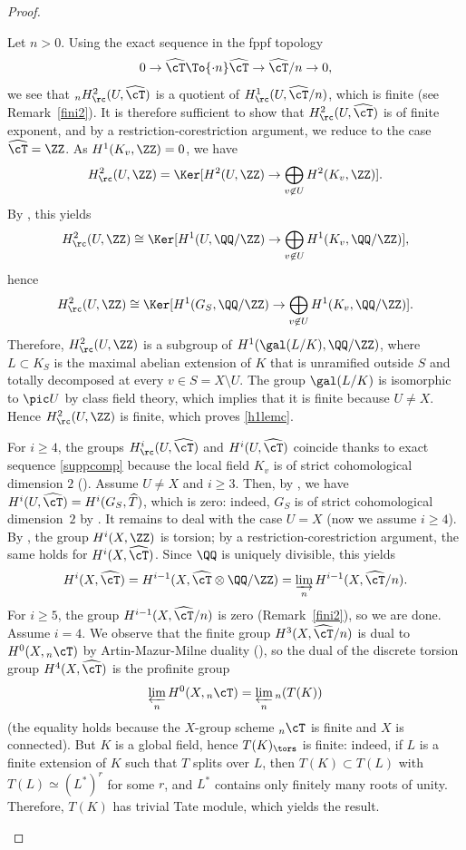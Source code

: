 \begin{proof}
\begin{enumeratea}
\item
Let $n >0$. Using the exact sequence in the fppf topology\vspace*{-3pt}
\begin{equation} \label{dualkummer}
0 \to \widehat\cT \To{\cdot n} \widehat\cT \to
\widehat\cT/n \to 0,
\end{equation}
we see that $_n H^2_\rc(U,\widehat\cT)$ is a quotient of
$H^1_\rc(U,\widehat\cT/n)$, which is finite (see Remark~\ref{fini2}).
It is therefore sufficient to show that $H^2_\rc(U,\widehat\cT)$ is
of finite exponent, and by a restriction-corestriction argument, we
reduce to the case $\widehat\cT=\ZZ$. As $H^1(K_v,\ZZ)=0$,
we have
\[
H^2_\rc(U,\ZZ)=\Ker [H^2(U,\ZZ) \to \bigoplus_{v \not \in U} H^2(K_v,\ZZ)].
\]
By \cite[Lem.\,II.2.10]{MilADT}, this yields
\[
H^2_\rc(U,\ZZ) \cong \Ker [H^1(U,\QQ/\ZZ) \to
\bigoplus_{v \not \in U} H^1(K_v,\QQ/\ZZ)],
\] hence
\[
H^2_\rc(U,\ZZ) \cong
\Ker [H^1(G_S,\QQ/\ZZ) \to \bigoplus_{v \not \in U} H^1(K_v,\QQ/\ZZ)].
\]
Therefore, $H^2_\rc(U,\ZZ)$ is a subgroup of $H^1(\gal(L/K),\QQ/\ZZ)$, where
$L \subset K_S$
is the maximal abelian extension of $K$ that is unramified outside $S$
and totally decomposed at every $v \in S=X \setminus U$.
The group $\gal(L/K)$ is isomorphic to $\pic U$ by class field
theory, which implies that it is finite because $U \neq X$. Hence
$H^2_\rc(U,\ZZ)$ is finite, which proves \eqref{h1lemc}.

\item
For $i \geq 4$, the groups $H^i_\rc(U,\widehat \cT)$ and $H^i(U, \widehat \cT)$
coincide thanks to exact sequence \eqref{suppcomp} because
the local field $K_v$ is of strict cohomological dimension $2$
(\cite[Cor.\,7.2.5]{nsw}).
Assume $U \neq X$ and $i \geq 3$. Then, by \cite[Prop.\,II.2.9]{MilADT},
we have $H^i(U,\widehat \cT)=H^i(G_S,\widehat T)$,
which is zero: indeed, $G_S$ is of strict cohomological dimension~$2$ by \cite[Th.\,8.3.17]{nsw}.
It remains to deal with the case $U=X$ (now we assume $i \geq 4$).
By \cite[Lem.\,II.2.10]{MilADT}, the group
$H^i(X,\ZZ)$ is torsion; by a restriction-corestriction argument, the
same holds for $H^i(X,\widehat \cT)$. Since $\QQ$ is uniquely
divisible, this yields
\[
H^i(X,\widehat \cT)=H^{i-1}(X,\widehat \cT \otimes \QQ/\ZZ)=
\varinjlim_n H^{i-1}(X,\widehat \cT/n).
\]
For $i \geq 5$, the group $H^{i-1}(X,\widehat \cT/n)$ is zero
(\cf Remark~\ref{fini2}), so we are done. Assu\-me $i=4$.
We observe that the finite group
$H^3(X,\widehat \cT/n)$ is dual to $H^0(X,{}_n \cT)$ by
Artin-Mazur-Milne duality (\cite[Th.\,1.1]{DemH}), so the dual of
the discrete torsion group $H^4(X,\widehat \cT)$ is the
profinite group
\[
\varprojlim_n H^0(X,{}_n \cT)=\varprojlim_n {_n (T(K))}
\]
(the equality holds because the $X$-group scheme $_n \cT$ is finite and
$X$ is connected). But $K$ is a global field,
hence $T(K)_\tors$ is finite: indeed, if $L$ is a finite extension
of $K$ such that $T$ splits over $L$, then $T(K) \subset T(L)$ with
$T(L) \simeq (L^*)^r$ for some $r$, and $L^*$ contains only finitely
many roots of unity.
Therefore, $T(K)$ has trivial Tate module, which yields the result.


\end{enumeratea}
\end{proof}
